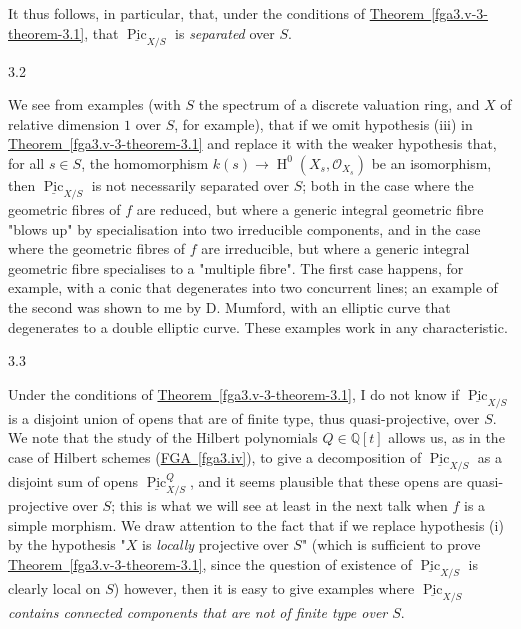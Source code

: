   It thus follows, in particular, that, under the conditions of \hyperref[fga3.v-3-theorem-3.1]{Theorem~\ref*{fga3.v-3-theorem-3.1}}, that \(\underline {\operatorname {Pic}}_{X/S}\) is \emph{separated} over \(S\).\begin{remark}{3.2}\label{fga3.v-3-remark-3.2}\skipsinglepar\par{}We see from examples (with \(S\) the spectrum of a discrete valuation ring, and \(X\) of relative dimension \(1\) over \(S\), for example), that if we omit hypothesis (iii) in \hyperref[fga3.v-3-theorem-3.1]{Theorem~\ref*{fga3.v-3-theorem-3.1}} and replace it with the weaker hypothesis that, for all \(s\in  S\), the homomorphism \(k(s)\to \operatorname {H}^0(X_s,\mathcal {O}_{X_s})\) be an isomorphism, then \(\underline {\operatorname {Pic}}_{X/S}\) is not necessarily separated over \(S\);
    both in the case where the geometric fibres of \(f\) are reduced, but where a generic integral geometric fibre "blows up" by specialisation into two irreducible components, and in the case where the geometric fibres of \(f\) are irreducible, but where a generic integral geometric fibre specialises to a "multiple fibre".
    The first case happens, for example, with a conic that degenerates into two concurrent lines; an example of the second was shown to me by D. Mumford, with an elliptic curve that degenerates to a double elliptic curve.
    These examples work in any characteristic.\end{remark}\begin{remark}{3.3}\label{fga3.v-3-remark-3.3}\skipsinglepar\par{}Under the conditions of \hyperref[fga3.v-3-theorem-3.1]{Theorem~\ref*{fga3.v-3-theorem-3.1}}, I do not know if \(\underline {\operatorname {Pic}}_{X/S}\) is a disjoint union of opens that are of finite type, thus quasi-projective, over \(S\).
    We note that the study of the Hilbert polynomials \(Q\in \mathbb {Q}[t]\) allows us, as in the case of Hilbert schemes (\hyperref[fga3.iv]{FGA~\ref*{fga3.iv}}), to give a decomposition of \(\underline {\operatorname {Pic}}_{X/S}\) as a disjoint sum of opens \(\underline {\operatorname {Pic}}_{X/S}^Q\), and it seems plausible that these opens are quasi-projective over \(S\);
    this is what we will see at least in the next talk when \(f\) is a simple morphism.
    We draw attention to the fact that if we replace hypothesis (i) by the hypothesis "\(X\) is \emph{locally} projective over \(S\)" (which is sufficient to prove \hyperref[fga3.v-3-theorem-3.1]{Theorem~\ref*{fga3.v-3-theorem-3.1}}, since the question of existence of \(\underline {\operatorname {Pic}}_{X/S}\) is clearly local on \(S\)) however, then it is easy to give examples where \emph{\(\underline {\operatorname {Pic}}_{X/S}\) contains connected components that are not of finite type over \(S\)}.
    

\end{remark}
